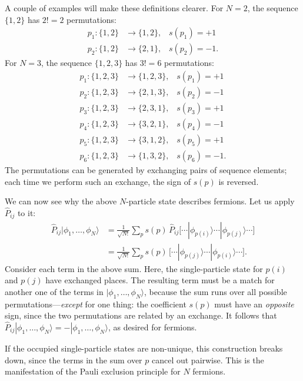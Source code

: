 \documentclass[pra,12pt]{revtex4}
\begin{document}
A couple of examples will make these definitions clearer.  For $N=2$,
the sequence $\{1,2\}$ has $2! = 2$ permutations:
$$\begin{aligned}p_1 : \{1,2\} &\rightarrow \{1,2\}, \;\;\;s(p_1) = +1 \\ p_2 : \{1,2\} &\rightarrow \{2,1\}, \;\;\;s(p_2) = -1.\end{aligned}$$
For $N=3$, the sequence $\{1,2,3\}$ has $3!=6$ permutations:
$$\begin{aligned}
  p_1 : \{1,2,3\} &\rightarrow \{1,2,3\}, \;\;\;s(p_1) = +1 \\
  p_2 : \{1,2,3\} &\rightarrow \{2,1,3\}, \;\;\;s(p_2) = -1 \\
  p_3 : \{1,2,3\} &\rightarrow \{2,3,1\}, \;\;\;s(p_3) = +1 \\
  p_4 : \{1,2,3\} &\rightarrow \{3,2,1\}, \;\;\;s(p_4) = -1 \\
  p_5 : \{1,2,3\} &\rightarrow \{3,1,2\}, \;\;\;s(p_5) = +1 \\
  p_6 : \{1,2,3\} &\rightarrow \{1,3,2\}, \;\;\;s(p_6) = -1.\end{aligned}$$
The permutations can be generated by exchanging pairs of sequence
elements; each time we perform such an exchange, the sign of $s(p)$
is reversed.

We can now see why the above $N$-particle state describes fermions.
Let us apply $\hat{P}_{ij}$ to it:
$$\begin{aligned}\hat{P}_{ij}|\phi_1,\dots,\phi_N\rangle &= \frac{1}{\sqrt{N!}} \sum_p s(p)\, \hat{P}_{ij} \big[\cdots |\phi_{p(i)}\rangle \cdots |\phi_{p(j)}\rangle \cdots\big] \\&= \frac{1}{\sqrt{N!}} \sum_p s(p)\, \big[\cdots |\phi_{p(j)}\rangle \cdots |\phi_{p(i)}\rangle \cdots\big].\end{aligned}$$
Consider each term in the above sum.  Here, the single-particle state
for $p(i)$ and $p(j)$ have exchanged places.  The resulting term must
be a match for another one of the terms in
$|\phi_1,\dots,\phi_N\rangle$, because the sum runs over all possible
permutations---\textit{except} for one thing: the coefficient $s(p)$
must have an \textit{opposite} sign, since the two permutations are
related by an exchange.  It follows that
$\hat{P}_{ij}|\phi_1,\dots,\phi_N\rangle = -
|\phi_1,\dots,\phi_N\rangle$, as desired for fermions.

If the occupied single-particle states are non-unique, this
construction breaks down, since the terms in the sum over $p$ cancel
out pairwise.  This is the manifestation of the Pauli exclusion
principle for $N$ fermions.
\end{document}
